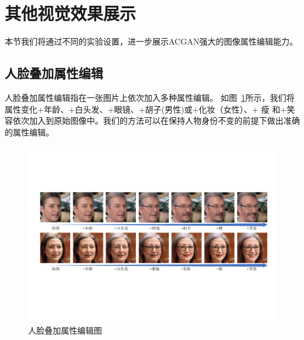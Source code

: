 \section{其他视觉效果展示}
本节我们将通过不同的实验设置，进一步展示ACGAN强大的图像属性编辑能力。

\subsection{人脸叠加属性编辑}
人脸叠加属性编辑指在一张图片上依次加入多种属性编辑。 如图~\ref{fig:multiAtt}所示，我们将属性变化+年龄、+白头发、+眼镜、+胡子(男性)或+化妆（女性）、+ 瘦
和+笑容依次加入到原始图像中。我们的方法可以在保持人物身份不变的前提下做出准确的属性编辑。


\begin{figure}[!t]
    \centering
    \includegraphics[width=1\linewidth]{figures/ACGAN/cover.pdf}
    \caption{人脸叠加属性编辑图}
    \label{fig:multiAtt}  
\end{figure}



